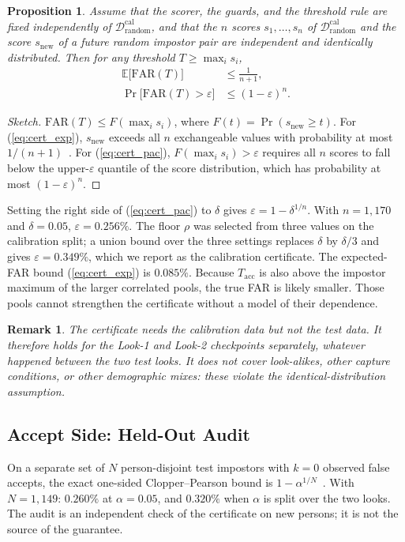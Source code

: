 \documentclass[journal]{IEEEtran}
\newtheorem{proposition}{Proposition}
\newtheorem{remark}{Remark}
\begin{document}
\begin{proposition}
\label{prop:cert}
Assume that the scorer, the guards, and the threshold rule are fixed independently of $\mathcal{D}^{\text{cal}}_{\text{random}}$, and that the $n$ scores $s_1,\dots,s_n$ of $\mathcal{D}^{\text{cal}}_{\text{random}}$ and the score $s_{\text{new}}$ of a future random impostor pair are independent and identically distributed. Then for any threshold $T\ge\max_i s_i$,
\begin{align}
\label{eq:cert_exp}
\mathbb{E}\big[\text{FAR}(T)\big] &\le \frac{1}{n+1},\\
\label{eq:cert_pac}
\Pr\big[\text{FAR}(T)>\varepsilon\big] &\le (1-\varepsilon)^{n}.
\end{align}
\end{proposition}
\begin{proof}[Sketch]
$\text{FAR}(T)\le F(\max_i s_i)$, where $F(t)=\Pr(s_{\text{new}}\ge t)$. For (\ref{eq:cert_exp}), $s_{\text{new}}$ exceeds all $n$ exchangeable values with probability at most $1/(n+1)$~\cite{vovk2005alrw}. For (\ref{eq:cert_pac}), $F(\max_i s_i)>\varepsilon$ requires all $n$ scores to fall below the upper-$\varepsilon$ quantile of the score distribution, which has probability at most $(1-\varepsilon)^n$.
\end{proof}

Setting the right side of (\ref{eq:cert_pac}) to $\delta$ gives $\varepsilon=1-\delta^{1/n}$. With $n=1{,}170$ and $\delta=0.05$, $\varepsilon=0.256\%$. The floor $\rho$ was selected from three values on the calibration split; a union bound over the three settings replaces $\delta$ by $\delta/3$ and gives $\varepsilon=0.349\%$, which we report as the calibration certificate. The expected-FAR bound (\ref{eq:cert_exp}) is $0.085\%$. Because $T_{\text{acc}}$ is also above the impostor maximum of the larger correlated pools, the true FAR is likely smaller. Those pools cannot strengthen the certificate without a model of their dependence.

\begin{remark}
The certificate needs the calibration data but not the test data. It therefore holds for the Look-1 and Look-2 checkpoints separately, whatever happened between the two test looks. It does not cover look-alikes, other capture conditions, or other demographic mixes: these violate the identical-distribution assumption.
\end{remark}

\subsection{Accept Side: Held-Out Audit}
On a separate set of $N$ person-disjoint test impostors with $k=0$ observed false accepts, the exact one-sided Clopper--Pearson bound is $1-\alpha^{1/N}$~\cite{clopper1934,hanley1983rule3}. With $N=1{,}149$: $0.260\%$ at $\alpha=0.05$, and $0.320\%$ when $\alpha$ is split over the two looks. The audit is an independent check of the certificate on new persons; it is not the source of the guarantee.
\end{document}
